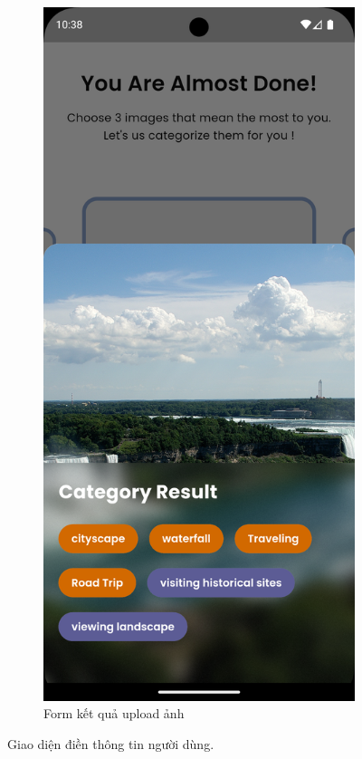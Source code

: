\begin{figure}[H]
  \begin{subfigure}{0.32\textwidth}
        \includegraphics[width=1\linewidth]{figures/c4/4-2/basic_info_4.png} 
        \caption{Form kết quả upload ảnh}
        \label{fig:survey-form}
    \end{subfigure}
    \caption{Giao diện điền thông tin người dùng.}
    \label{fig:basic-information-screen}
\end{figure}

